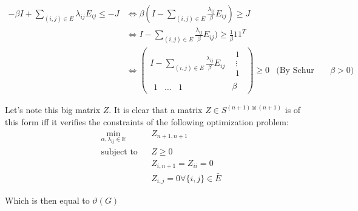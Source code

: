 \documentclass[11pt]{article}
\begin{document}
\begin{align*}
-\beta I + \sum_{(i,j) \in E} \lambda_{ij} E_{ij} \le -J
&\iff \beta(I - \sum_{(i,j) \in E} \frac{\lambda_{ij}}{\beta} E_{ij}) \ge J
\\&\iff I - \sum_{(i,j) \in E} \frac{\lambda_{ij}}{\beta} E_{ij}) \ge \frac1\beta 11^T
\\&\iff \begin{pmatrix}I - \sum_{(i,j) \in E} \frac{\lambda_{ij}}{\beta} E_{ij} & \begin{matrix}1\\\vdots\\1\end{matrix}\\
 \begin{matrix}1&\ldots&1\end{matrix}&\beta\end{pmatrix} \ge 0 &\text{(By Schur Lemma bc $\beta > 0$)}
\end{align*}


Let's note this big matrix \(Z\). It is clear that a matrix \(Z \in S^{(n+1) \otimes (n+1)}\) is of this form iff it verifies the constraints of the following optimization problem:
\begin{align*}
& \underset{\alpha, \lambda_{ij} \in \mathbb R}{\text{min}}
& & Z_{n+1, n+1} \\
& \text{subject to}
& & Z \ge 0
\\&&& Z_{i,n+1} = Z_{ii} = 0
\\&&& Z_{i,j} = 0 \forall \{i, j\} \in \bar E
\end{align*}

Which is then equal to \(\vartheta(G)\)
\end{document}
